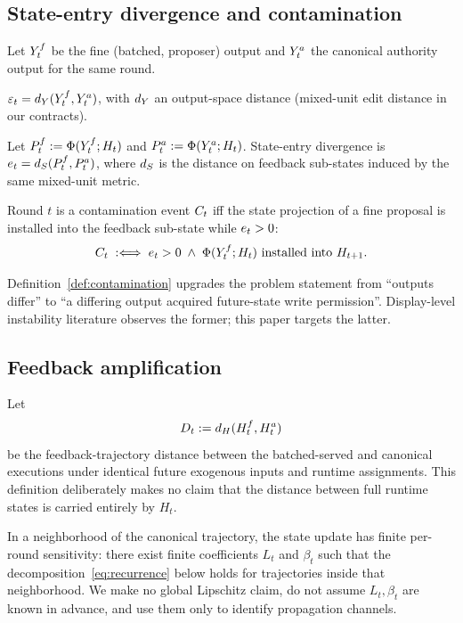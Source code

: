 \subsection{State-entry divergence and contamination}\label{sec:model:divergence}

Let $Y_t^{f}$ be the fine (batched, proposer) output and $Y_t^{a}$ the
canonical authority output for the same round.

\begin{definition}\label{def:eps}
$\varepsilon_t = d_{Y}(Y_t^{f},Y_t^{a})$, with $d_{Y}$ an
output-space distance (mixed-unit edit distance in our contracts).
\end{definition}

\begin{definition}\label{def:e}
Let $P_t^f:=\Phi(Y_t^{f};H_t)$ and
$P_t^a:=\Phi(Y_t^{a};H_t)$. State-entry divergence is
$e_t=d_{S}(P_t^f,P_t^a)$, where $d_{S}$ is the distance on
feedback sub-states induced by the same mixed-unit metric.
\end{definition}

\begin{definition}\label{def:contamination}
Round $t$ is a contamination event $C_t$ iff the state projection of a
fine proposal is installed into the feedback sub-state while $e_t > 0$:
\[
  C_t \;:\Longleftrightarrow\; e_t > 0 \;\wedge\;
  \Phi(Y_t^{f};H_t) \text{ installed into } H_{t+1}.
\]
\end{definition}

Definition~\ref{def:contamination} upgrades the problem statement from
``outputs differ'' to ``a differing output acquired future-state write
permission''. Display-level instability literature observes the former;
this paper targets the latter.

\subsection{Feedback amplification}\label{sec:model:amplification}

Let
\[
  D_t := d_H(H_t^{f},H_t^{a})
\]
be the feedback-trajectory distance between the batched-served and canonical
executions under identical future exogenous inputs and runtime assignments.
This definition deliberately makes no claim that the distance between full
runtime states is carried entirely by $H_t$.

\begin{assumption}\label{ass:local}
In a neighborhood of the canonical trajectory, the state update has finite
per-round sensitivity: there exist finite coefficients $L_t$ and $\beta_t$
such that the decomposition~\eqref{eq:recurrence} below holds for
trajectories inside that neighborhood. We make no global Lipschitz claim,
do not assume $L_t,\beta_t$ are known in advance, and use them only to
identify propagation channels.
\end{assumption}


